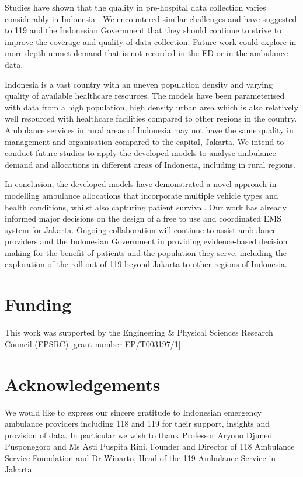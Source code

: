 \documentclass[numbers,webpdf,imaman]{ima-authoring-template}%
\begin{document}
Studies have shown that the quality in pre-hospital data collection varies
considerably in Indonesia \citep{hooper2019_datacollection}. We encountered
similar challenges and have suggested to 119 and the Indonesian Government
that they should continue to strive to improve the coverage and quality of
data collection. Future work could explore in more depth unmet demand that is
not recorded in the ED or in the ambulance data.

Indonesia is a vast country with an uneven population density and varying
quality of available healthcare resources. The models have been parameterised
with data from a high population, high density urban area which is also
relatively well resourced with healthcare facilities compared to other regions
in the country. Ambulance services in rural areas of Indonesia may not have
the same quality in management and organisation compared to the capital,
Jakarta. We intend to conduct future studies to apply the developed models to
analyse ambulance demand and allocations in different areas of Indonesia,
including in rural regions.

In conclusion, the developed models have demonstrated a novel approach in
modelling ambulance allocations that incorporate multiple vehicle types and
health conditions, whilst also capturing patient survival. Our work has
already informed major decisions on the design of a free to use and
coordinated EMS system for Jakarta. Ongoing collaboration will continue to
assist ambulance providers and the Indonesian Government in providing
evidence-based decision making for the benefit of patients and the population
they serve, including the exploration of the roll-out of 119 beyond Jakarta to
other regions of Indonesia. 


\section*{Funding}
This work was supported by the Engineering \& Physical Sciences Research Council
(EPSRC) [grant number EP/T003197/1].

\section*{Acknowledgements}
We would like to express our sincere gratitude to Indonesian emergency ambulance
providers including 118 and 119 for their support, insights and provision of
data. In particular we wish to thank Professor Aryono Djuned Pusponegoro and Ms
Asti Puspita Rini, Founder and Director of 118 Ambulance Service Foundation and
Dr Winarto, Head of the 119 Ambulance Service in Jakarta.
\end{document}
